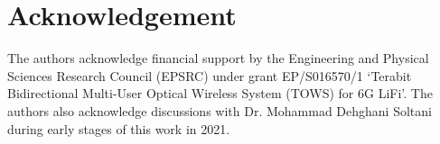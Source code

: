 \documentclass[lettersize,journal]{IEEEtran}
\begin{document}
\section*{Acknowledgement}
The authors acknowledge financial support by the Engineering and Physical Sciences Research Council (EPSRC) under grant EP/S016570/1 `Terabit Bidirectional Multi-User Optical Wireless System (TOWS) for 6G LiFi'. The authors also acknowledge discussions with Dr. Mohammad Dehghani Soltani during early stages of this work in 2021.




% 





\end{document}
